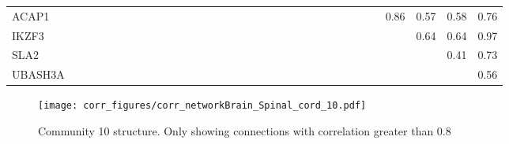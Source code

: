 \begin{longtable}{lrrrrrrrrrrrrrrrrrrrrrrrrrrrrrrrr}
ACAP1    &              &           &            &           &              &              &            &              &           &             &             &            &            &             &            &            &            &           &            &           &                &            &            &            &             &             &            &             &        0.86 &       0.57 &          0.58 &        0.76 \\
IKZF3    &              &           &            &           &              &              &            &              &           &             &             &            &            &             &            &            &            &           &            &           &                &            &            &            &             &             &            &             &             &       0.64 &          0.64 &        0.97 \\
SLA2     &              &           &            &           &              &              &            &              &           &             &             &            &            &             &            &            &            &           &            &           &                &            &            &            &             &             &            &             &             &            &          0.41 &        0.73 \\
UBASH3A  &              &           &            &           &              &              &            &              &           &             &             &            &            &             &            &            &            &           &            &           &                &            &            &            &             &             &            &             &             &            &               &        0.56 \\
\end{longtable}


\begin{figure}[h!]
\centering
\texttt{[image: corr\_figures/corr\_networkBrain\_Spinal\_cord\_10.pdf]}
\caption{Community 10 structure. Only showing connections with correlation greater than 0.8}
\end{figure}




